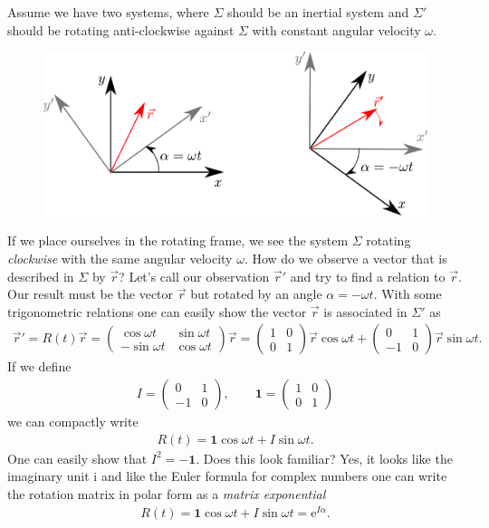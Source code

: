 \documentclass[10pt,a4paper]{article}
\newcommand{\e}{\mathrm{e}}
\begin{document}
Assume we have two systems, where $\Sigma$ should be an inertial system and $\Sigma'$ should be rotating anti-clockwise against $\Sigma$ with constant angular velocity $\omega$.
%
\begin{figure}[H]
\includegraphics[scale=0.6]{rotating_system.pdf}
\end{figure}
%
If we place ourselves in the rotating frame, we see the system $\Sigma$ rotating \textit{clockwise} with the same angular velocity $\omega$.
%
How do we observe a vector that is described in $\Sigma$ by $\vec{r}$?
%
Let's call our observation $\vec{r}'$ and try to find a relation to $\vec{r}$.
%
Our result must be the vector $\vec{r}$ but rotated by an angle $\alpha=-\omega t$.
%
With some trigonometric relations one can easily show the vector $\vec{r}$ is associated in $\Sigma'$ as
%
\begin{align}
\vec{r}' = R(t) \vec{r} = \begin{pmatrix}
\cos \omega t & \sin \omega t \\
-\sin \omega t & \cos \omega t
\end{pmatrix} \vec{r} =  \begin{pmatrix}
1 & 0 \\
0 & 1
\end{pmatrix} \vec{r} \cos \omega t + \begin{pmatrix}
0 & 1 \\
-1 & 0
\end{pmatrix} \vec{r} \sin \omega t .
\end{align}
%
If we define  
\begin{align}
I =  \begin{pmatrix}
0 & 1 \\
-1 & 0
\end{pmatrix}  , \qquad \boldsymbol{1} = \begin{pmatrix}
1 & 0 \\
0 & 1
\end{pmatrix}
\end{align} 
%
we can compactly write 
%
\begin{align}
R(t) = \boldsymbol{1} \cos \omega t + I \sin \omega t .
\end{align}
%
One can easily show that $I^2 = - \boldsymbol{1}$.
%
Does this look familiar? Yes, it looks like the imaginary unit $\mathrm{i}$ and like the Euler formula for complex numbers one can write the rotation matrix in polar form as a \textit{matrix exponential} 
%
\begin{align}
R(t) = \boldsymbol{1} \cos \omega t + I \sin \omega t = \e^{I\alpha} .
\end{align}
\end{document}
